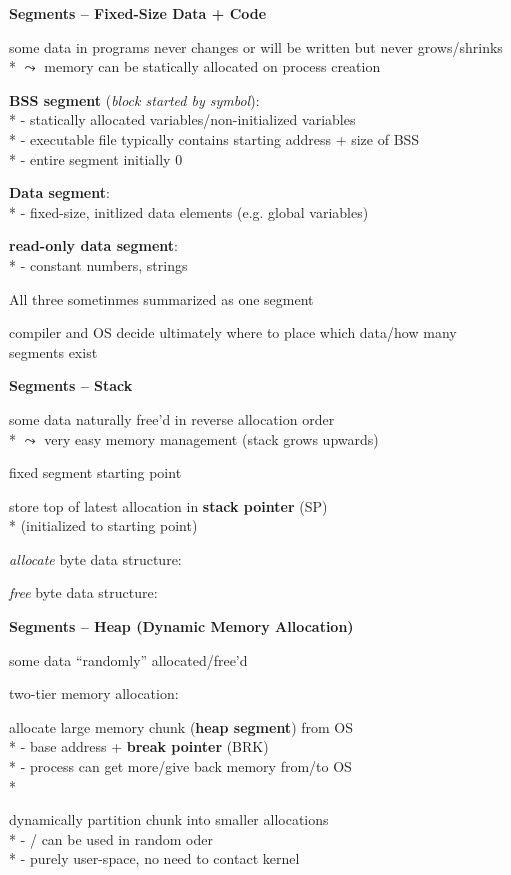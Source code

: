 \textbf{Segments -- Fixed-Size Data + Code}
\begin{items}
	\item some data in programs never changes or will be written but never grows/shrinks \\*
		\( \leadsto \) memory can be statically allocated on process creation
	\item \textbf{BSS segment} (\emph{block started by symbol}): \\*
		- statically allocated variables/non-initialized variables \\*
		- executable file typically contains starting address + size of BSS \\*
		- entire segment initially 0
	\item \textbf{Data segment}: \\*
		- fixed-size, initlized data elements (e.g. global variables)
	\item \textbf{read-only data segment}: \\*
		- constant numbers, strings
	\item All three sometinmes summarized as one segment
	\item compiler and OS decide ultimately where to place which data/how many segments exist
\end{items}

\textbf{Segments -- Stack}
\begin{items}
	\item some data naturally free'd in reverse allocation order \\*
		\( \leadsto \) very easy memory management (stack grows upwards)
	\item fixed segment starting point
	\item store top of latest allocation in \textbf{stack pointer} (SP) \\*
		(initialized to starting point)
	\item \emph{allocate}  byte data structure: 
	\item \emph{free}  byte data structure: 
\end{items}

\textbf{Segments -- Heap (Dynamic Memory Allocation)}
\begin{items}
	\item some data "`randomly"' allocated/free'd
	\item two-tier memory allocation:
	\begin{enumeration}
		\item allocate large memory chunk (\textbf{heap segment}) from OS \\*
			- base address + \textbf{break pointer} (BRK) \\*
			- process can get more/give back memory from/to OS \\*
		\item dynamically partition chunk into smaller allocations \\*
			- / can be used in random oder \\*
			- purely user-space, no need to contact kernel
	\end{enumeration}
\end{items}

